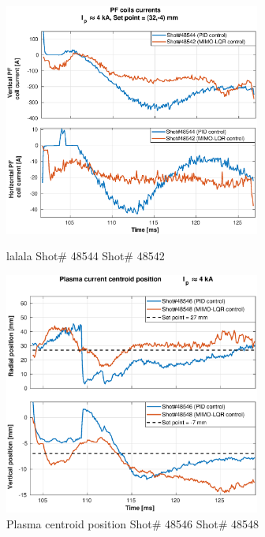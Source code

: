 \begin{figure}
	\centering
	\includegraphics[width=0.75\textwidth]{Chp5/PIDvsMIMO_544_542_curr_2.eps}
	\label{564_559curr}
	\caption{lalala   Shot\# 48544 Shot\# 48542}
\end{figure}

\begin{figure}
	\centering
	\includegraphics[width=0.75\textwidth]{Chp5/PIDvsMIMO_546_548_2.eps}
	\caption{Plasma centroid position  Shot\# 48546 Shot\# 48548}
\end{figure}

